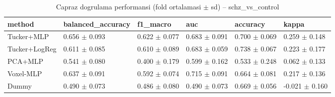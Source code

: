\begin{table}[htbp]
  \centering
  \caption{Capraz dogrulama performansi (fold ortalamasi $\pm$ sd) -- schz\_vs\_control}
  \label{tab:main_schz_vs_control}
  \small
  \begin{tabular}{llllll}
    \toprule
    method & balanced\_accuracy & f1\_macro & auc & accuracy & kappa \\
    \midrule
    Tucker+MLP & 0.656 $\pm$ 0.093 & 0.622 $\pm$ 0.077 & 0.683 $\pm$ 0.091 & 0.700 $\pm$ 0.069 & 0.259 $\pm$ 0.148 \\
    Tucker+LogReg & 0.611 $\pm$ 0.085 & 0.610 $\pm$ 0.089 & 0.683 $\pm$ 0.059 & 0.738 $\pm$ 0.067 & 0.223 $\pm$ 0.177 \\
    PCA+MLP & 0.541 $\pm$ 0.080 & 0.400 $\pm$ 0.179 & 0.599 $\pm$ 0.162 & 0.533 $\pm$ 0.248 & 0.062 $\pm$ 0.133 \\
    Voxel-MLP & 0.637 $\pm$ 0.091 & 0.592 $\pm$ 0.074 & 0.715 $\pm$ 0.091 & 0.664 $\pm$ 0.081 & 0.217 $\pm$ 0.136 \\
    Dummy & 0.490 $\pm$ 0.073 & 0.486 $\pm$ 0.080 & 0.490 $\pm$ 0.073 & 0.669 $\pm$ 0.056 & -0.021 $\pm$ 0.160 \\
    \bottomrule
  \end{tabular}
\end{table}
